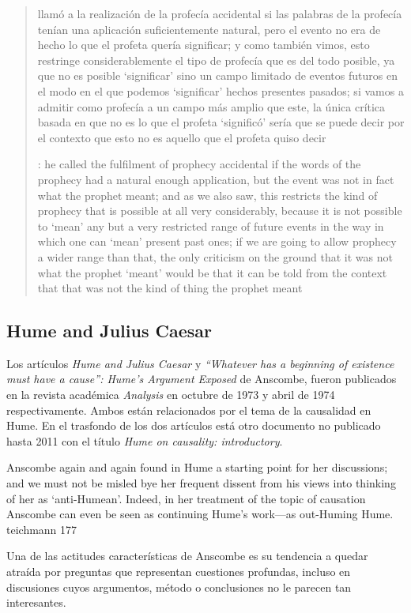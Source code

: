 \blockquote[{\cite[33]{anscombe2008faith:prophandmi}}: he called the fulfilment
of prophecy accidental if the words of the prophecy had a natural enough
application, but the event was not in fact what the prophet meant; and as we
also saw, this restricts the kind of prophecy that is possible at all very
considerably, because it is not possible to `mean' any but a very restricted
range of future events in the way in which one can `mean' present 
past ones; if we are going to allow prophecy a wider range than that, the only
criticism on the ground that it was not what the prophet `meant' would be that
it can be told from the context that that was not the kind of thing the prophet
meant]{llamó a la realización de la profecía accidental si las palabras de la
  profecía tenían una aplicación suficientemente natural, pero el evento no era
  de hecho lo que el profeta quería significar; y como también vimos, esto
  restringe considerablemente el tipo de profecía que es del todo posible, ya
  que no es posible `significar' sino un campo limitado de eventos futuros en el
  modo en el que podemos `significar' hechos presentes  pasados; si
  vamos a admitir como profecía a un campo más amplio que este, la única crítica
  basada en que no es lo que el profeta `significó' sería que se puede decir por
  el contexto que esto no es aquello que el profeta quiso decir}

\subsection{Hume and Julius Caesar}

Los artículos \emph{Hume and Julius Caesar} y \emph{``Whatever has a beginning
  of existence must have a cause'': Hume’s Argument Exposed} de Anscombe, fueron
publicados en la revista académica \emph{Analysis} en octubre de 1973 y abril de
1974 respectivamente. Ambos están relacionados por el tema de la causalidad en
Hume. En el trasfondo de los dos artículos está otro documento no publicado
hasta 2011 con el título \emph{Hume on causality: introductory}.

Anscombe again and again found in Hume a starting point for her discussions; and
we must not be misled bye her frequent dissent from his views into thinking of
her as `anti-Humean'. Indeed, in her treatment of the topic of causation
Anscombe can even be seen as continuing Hume's work---as out-Huming Hume.
teichmann 177

  Una de las actitudes características de Anscombe es su tendencia a quedar
  atraída por preguntas que representan cuestiones profundas, incluso en
  discusiones cuyos argumentos, método o conclusiones no le parecen tan
  interesantes.

